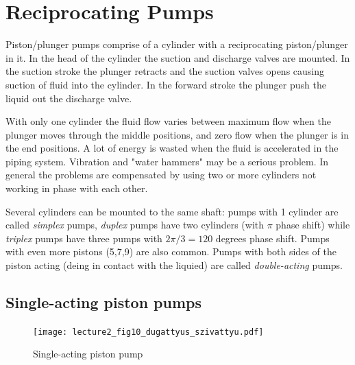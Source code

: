 \section{Reciprocating Pumps}

Piston/plunger pumps comprise of a cylinder with a reciprocating piston/plunger in it. In the head of the cylinder the suction and discharge valves are mounted. In the suction stroke the plunger retracts and the suction valves opens causing suction of fluid into the cylinder. In the forward stroke the plunger push the liquid out the discharge valve.

With only one cylinder the fluid flow varies between maximum flow when the plunger moves through the middle positions, and zero flow when the plunger is in the end positions. A lot of energy is wasted when the fluid is accelerated in the piping system. Vibration and "water hammers" may be a serious problem. In general the problems are compensated by using two or more cylinders not working in phase with each other.

Several cylinders can be mounted to the same shaft: pumps with 1 cylinder are called \emph{simplex} pumps, \emph{duplex} pumps have two cylinders (with $\pi$ phase shift) while \emph{triplex} pumps have three pumps with $2 \pi/3 = 120$ degrees phase shift. Pumps with even more pistons (5,7,9) are also common. Pumps with both sides of the piston acting (deing in contact with the liquied) are called \emph{double-acting} pumps.


\subsection{Single-acting piston pumps}




\begin{figure}[tbh]
\begin{center}
\texttt{[image: lecture2\_fig10\_dugattyus\_szivattyu.pdf]}
\caption{\label{fig:single_acting_piston_pump}Single-acting piston pump}
\end{center}
\end{figure}

